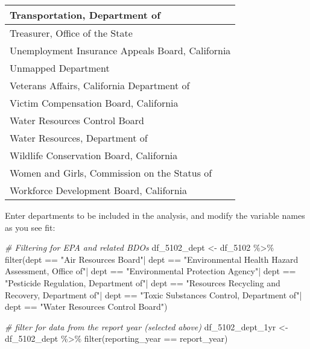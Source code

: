 \documentclass[
]{article}
\newenvironment{Shaded}{\begin{snugshade}}{\end{snugshade}}
\newcommand{\CommentTok}[1]{\textcolor[rgb]{0.56,0.35,0.01}{\textit{#1}}}
\newcommand{\FunctionTok}[1]{\textcolor[rgb]{0.00,0.00,0.00}{#1}}
\newcommand{\NormalTok}[1]{#1}
\newcommand{\OtherTok}[1]{\textcolor[rgb]{0.56,0.35,0.01}{#1}}
\newcommand{\SpecialCharTok}[1]{\textcolor[rgb]{0.00,0.00,0.00}{#1}}
\newcommand{\StringTok}[1]{\textcolor[rgb]{0.31,0.60,0.02}{#1}}
\begin{document}
\begin{table}
\begin{tabular}[t]{l}
\hline
Transportation, Department of\\
\hline
Treasurer, Office of the State\\
\hline
Unemployment Insurance Appeals Board, California\\
\hline
Unmapped Department\\
\hline
Veterans Affairs, California Department of\\
\hline
Victim Compensation Board, California\\
\hline
Water Resources Control Board\\
\hline
Water Resources, Department of\\
\hline
Wildlife Conservation Board, California\\
\hline
Women and Girls, Commission on the Status of\\
\hline
Workforce Development Board, California\\
\hline
\end{tabular}
\end{table}

Enter departments to be included in the analysis, and modify the
variable names as you see fit:

\begin{Shaded}
\begin{Highlighting}[]
\CommentTok{\# Filtering for EPA and related BDOs }
\NormalTok{df\_5102\_dept }\OtherTok{\textless{}{-}}\NormalTok{ df\_5102 }\SpecialCharTok{\%\textgreater{}\%} 
    \FunctionTok{filter}\NormalTok{(dept }\SpecialCharTok{==} \StringTok{"Air Resources Board"}\SpecialCharTok{|}
\NormalTok{               dept }\SpecialCharTok{==} \StringTok{"Environmental Health Hazard Assessment, Office of"}\SpecialCharTok{|}
\NormalTok{               dept }\SpecialCharTok{==} \StringTok{"Environmental Protection Agency"}\SpecialCharTok{|}
\NormalTok{               dept }\SpecialCharTok{==} \StringTok{"Pesticide Regulation, Department of"}\SpecialCharTok{|}
\NormalTok{               dept }\SpecialCharTok{==} \StringTok{"Resources Recycling and Recovery, Department of"}\SpecialCharTok{|}
\NormalTok{               dept }\SpecialCharTok{==} \StringTok{"Toxic Substances Control, Department of"}\SpecialCharTok{|}
\NormalTok{               dept }\SpecialCharTok{==} \StringTok{"Water Resources Control Board"}\NormalTok{)}

\CommentTok{\# filter for data from the report year (selected above)}
\NormalTok{df\_5102\_dept\_1yr }\OtherTok{\textless{}{-}}\NormalTok{ df\_5102\_dept }\SpecialCharTok{\%\textgreater{}\%} 
    \FunctionTok{filter}\NormalTok{(reporting\_year }\SpecialCharTok{==}\NormalTok{ report\_year)}
\end{Highlighting}
\end{Shaded}
\end{document}
